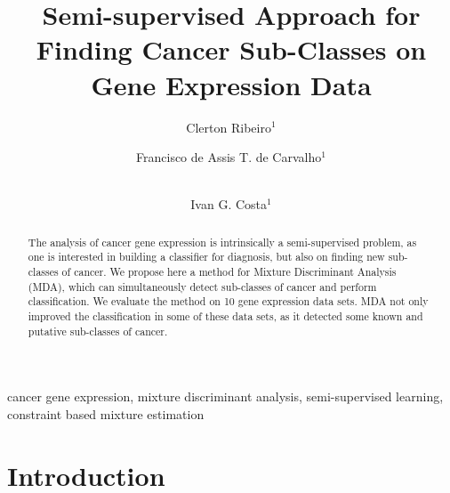 \documentclass[runningheads,a4paper]{llncs}
\newcommand{\keywords}[1]{\par\addvspace\baselineskip
\noindent\keywordname\enspace\ignorespaces#1}
\begin{document}
\mainmatter  %

%

\title{Semi-supervised Approach for Finding Cancer Sub-Classes on Gene Expression Data}


%
%
\author{Clerton Ribeiro$^1$ \and Francisco de Assis T. de Carvalho$^1$ \and \\ Ivan G. Costa$^1$}
%


\maketitle

\begin{abstract}
  The analysis of cancer gene expression is intrinsically a
  semi-supervised problem, as one is interested in building a
  classifier for diagnosis, but also on finding new sub-classes of
  cancer. We propose here a method for Mixture Discriminant Analysis
  (MDA), which can simultaneously detect sub-classes of cancer and
  perform classification.  We evaluate the method on 10 gene
  expression data sets. MDA not only improved the classification in
  some of these data sets, as it detected some known and putative
  sub-classes of cancer.
\end{abstract}

\keywords{cancer gene expression, mixture discriminant analysis, semi-supervised learning, constraint based mixture estimation}


\section{Introduction}
\end{document}
